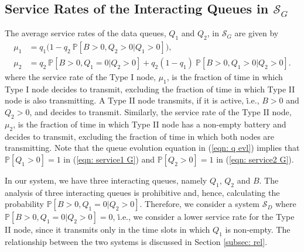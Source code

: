 \documentclass[draftcls,12pt,onecolumn]{IEEEtran}
\begin{document}
\subsection{Service Rates of the Interacting Queues in $\mathcal{S}_G$}\label{subsec: Ser G}
The average service rates of the data queues, $Q_1$ and $Q_2$, in $\mathcal{S}_G$ are given by 
\begin{align}
\mu_1 &= q_1 \big(1-q_2 \ \mathbb{P}[B \! > \!0, Q_2 \!> \!0| Q_1 \! > \!0] \big), \label{eqn: service1 G}\\
\mu_2 &= q_2 \ \mathbb{P}[B\!>\!0, Q_1\!=\! 0| Q_2\!>\!0]  + q_2 \left( 1-q_1\right) \ \mathbb{P}[B\!>\!0, Q_1\!>\! 0| Q_2\!>\!0]. \label{eqn: service2 G}
\end{align}
where the service rate of the Type I node, $\mu_1$, is the fraction of time in which Type I node decides to transmit, excluding the fraction of time in which Type II node is also transmitting. A Type II node transmits, if it is active, \.i.e., $B \! > \!0$ and $Q_2 \! > \!0$, and decides to transmit. Similarly, the service rate of the Type II node, $\mu_2$, is the fraction of time in which Type II node has a non-empty battery and decides to transmit, excluding the fraction of time in which both nodes are transmitting. Note that the queue evolution equation in (\ref{eqn: q evl}) implies that $ \mathbb{P}[Q_1>0]=1$ in (\ref{eqn: service1 G}) and $ \mathbb{P}[Q_2>0]=1$ in (\ref{eqn: service2 G}). 

In our system, we have three interacting queues, namely $Q_1$, $Q_2$ and $B$. The analysis of three interacting queues is prohibitive and, hence, calculating the probability $ \mathbb{P}[B\!>\!0, Q_1\!=\! 0| Q_2\!>\!0]$. Therefore, we consider a system $\mathcal{S}_D$ where $ \mathbb{P}[B\!>\!0, Q_1\!=\! 0| Q_2\!>\!0 ]\!=\!0$, \.i.e., we consider a lower service rate for the Type II node, since it transmits only in the time slots in which $Q_1$ is non-empty. The relationship between the two systems is discussed in Section \ref{subsec: rel}.
\vspace{-0.15in}
\end{document}
